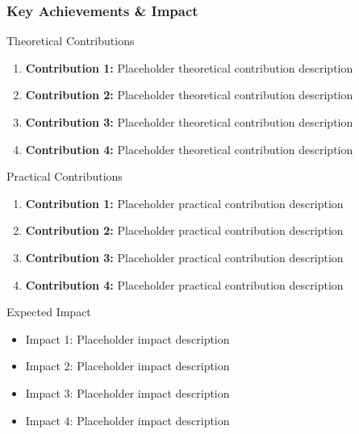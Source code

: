 \begin{frame}
\frametitle{Key Achievements \& Impact}
\begin{block}{Theoretical Contributions}
\begin{enumerate}
\item \textbf{Contribution 1:} Placeholder theoretical contribution description
\item \textbf{Contribution 2:} Placeholder theoretical contribution description
\item \textbf{Contribution 3:} Placeholder theoretical contribution description
\item \textbf{Contribution 4:} Placeholder theoretical contribution description
\end{enumerate}
\end{block}

\begin{block}{Practical Contributions}
\begin{enumerate}
\item \textbf{Contribution 1:} Placeholder practical contribution description
\item \textbf{Contribution 2:} Placeholder practical contribution description
\item \textbf{Contribution 3:} Placeholder practical contribution description
\item \textbf{Contribution 4:} Placeholder practical contribution description
\end{enumerate}
\end{block}

\begin{block}{Expected Impact}
\begin{itemize}
\item \textcolor{mygreen}{Impact 1:} Placeholder impact description
\item \textcolor{mygreen}{Impact 2:} Placeholder impact description
\item \textcolor{mygreen}{Impact 3:} Placeholder impact description
\item \textcolor{mygreen}{Impact 4:} Placeholder impact description
\end{itemize}
\end{block}
\end{frame}

